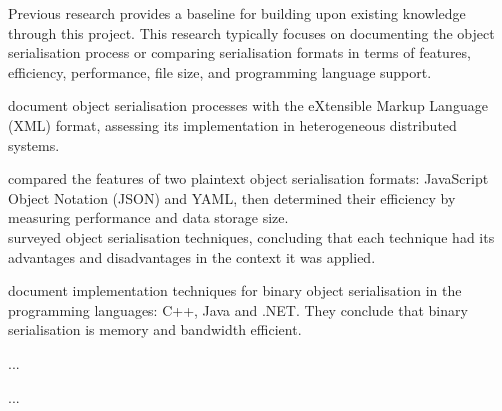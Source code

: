 \documentclass[../report.tex]{subfiles}
\begin{document}
Previous research provides a baseline for building upon existing knowledge through this project. This research typically focuses on documenting the object serialisation process or comparing serialisation formats in terms of features, efficiency, performance, file size, and programming language support.

\cite{goff2001xmlserialization} document object serialisation processes with the eXtensible Markup Language (XML) format, assessing its implementation in heterogeneous distributed systems.

\cite{eriksson2011comparison} compared the features of two plaintext object serialisation formats: JavaScript Object Notation (JSON) and YAML, then determined their efficiency by measuring performance and data storage size. \\
\cite{kazuaki2011survey} surveyed object serialisation techniques, concluding that each technique had its advantages and disadvantages in the context it was applied.

\cite{tauro2012binary} document implementation techniques for binary object serialisation in the programming languages: C++, Java and .NET. They conclude that binary serialisation is memory and bandwidth efficient.

\cite{sumaray2012efficiency} ...

\cite{vanura2018performance} ...
\end{document}
